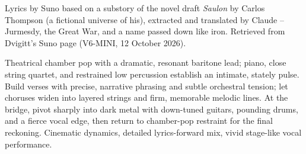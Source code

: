 
\begin{notes}
Lyrics by Suno based on a substory of the novel draft \emph{Saulon} by Carlos Thompson (a fictional universe of his), extracted and translated by Claude -- Jurmesdy, the Great War, and a name passed down like iron. Retrieved from Dvigitt's Suno page (V6-MINI, 12 October 2026).
\end{notes}
\begin{style}
Theatrical chamber pop with a dramatic, resonant baritone lead; piano, close string quartet, and restrained low percussion establish an intimate, stately pulse. Build verses with precise, narrative phrasing and subtle orchestral tension; let choruses widen into layered strings and firm, memorable melodic lines. At the bridge, pivot sharply into dark metal with down-tuned guitars, pounding drums, and a fierce vocal edge, then return to chamber-pop restraint for the final reckoning. Cinematic dynamics, detailed lyrics-forward mix, vivid stage-like vocal performance.
\end{style}
